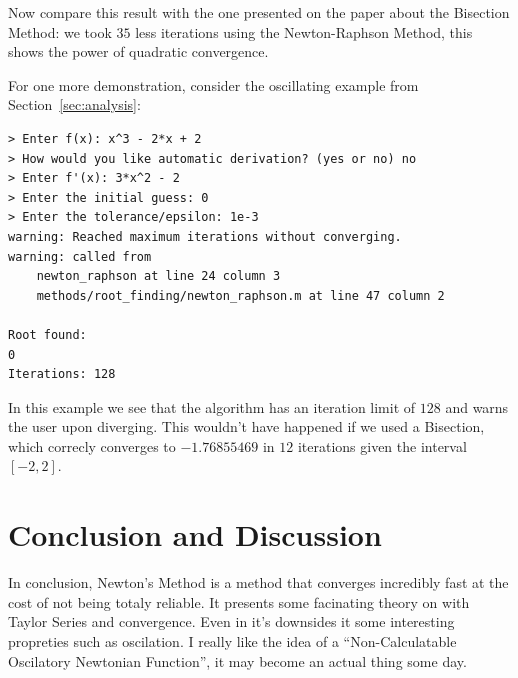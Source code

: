 \documentclass[12pt]{article}
\theoremstyle{remark}
\begin{document}
Now compare this result with the one presented on the paper about the Bisection Method: we took $35$ less iterations using the Newton-Raphson Method, this shows the power of quadratic convergence.

For one more demonstration, consider the oscillating example from Section~\ref{sec:analysis}:
\begin{lstlisting}[caption={Diverging example},label={lst:divergence-run}]
> Enter f(x): x^3 - 2*x + 2
> How would you like automatic derivation? (yes or no) no
> Enter f'(x): 3*x^2 - 2
> Enter the initial guess: 0
> Enter the tolerance/epsilon: 1e-3
warning: Reached maximum iterations without converging.
warning: called from
    newton_raphson at line 24 column 3
    methods/root_finding/newton_raphson.m at line 47 column 2

Root found:
0
Iterations: 128
\end{lstlisting}
In this example we see that the algorithm has an iteration limit of $128$ and warns the user upon diverging. This wouldn't have happened if we used a Bisection, which correcly converges to $-1.76855469$ in $12$ iterations given the interval $[-2, 2]$.

\section{Conclusion and Discussion}\label{sec:conlusion}

In conclusion, Newton's Method is a method that converges incredibly fast at the cost of not being totaly reliable. It presents some facinating theory on with Taylor Series and convergence. Even in it's downsides it some interesting propreties such as oscilation. I really like the idea of a ``Non-Calculatable Oscilatory Newtonian Function'', it may become an actual thing some day.



\end{document}
